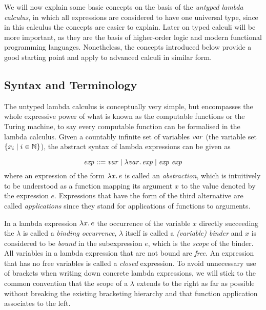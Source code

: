 We will now explain some basic concepts on the basis of the \emph{untyped lambda
  calculus}, in which all expressions are considered to have one universal type,
since in this calculus the concepts are easier to explain.  Later on typed
calculi will be more important, as they are the basis of higher-order logic and
modern functional programming languages. Nonetheless, the concepts introduced
below provide a good starting point and apply to advanced calculi in similar form.


\subsection{Syntax and Terminology}
\label{sec:syntax-terminology}


The untyped lambda calculus is conceptually very simple, but encompasses the
whole expressive power of what is known as the computable functions or the
Turing machine, \IE to say every computable function can be formalised in the
lambda calculus. Given a countably infinite set of variables $\mathit{var}$ (\EG the
variable set $\{x_i \;|\; i \in \mathbb{N}\}$), the abstract syntax of lambda
expressions can be given as

\begin{equation}
  \label{eq:syntax-lambda}
  \mathit{exp}  ::=  \mathit{var} \;|\;
  {\lambda \mathit{var}.\,\mathit{exp}} \;|\; \mathit{exp}\ \mathit{exp}
\end{equation}
where an expression of the form ${\lambda x.\,e}$ is called an
\emph{abstraction}, which is intuitively to be understood as a function mapping
its argument $x$ to the value denoted by the expression $e$. Expressions that
have the form of the third alternative are called \emph{applications} since they
stand for applications of functions to arguments.

In a lambda expression ${\lambda x.\,e}$ the occurrence of the variable $x$
directly succeeding the $\lambda$ is called a \emph{binding occurrence}, $\lambda$ itself is
called a \emph{(variable) binder} and $x$ is considered to be \emph{bound} in
the subexpression $e$, which is the \emph{scope} of the binder. All variables in
a lambda expression that are not bound are \emph{free}. An expression that has
no free variables is called a \emph{closed} expression. To avoid
unnecessary use of brackets when writing down concrete lambda expressions, we
will stick to the common convention that the scope of a $\lambda$ extends to the
right as far as possible without breaking the existing bracketing hierarchy and
that function application associates to the left.

